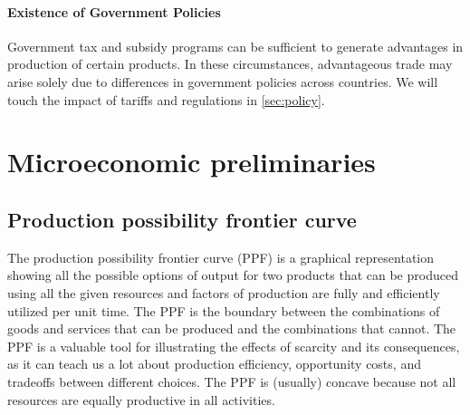{	\paragraph{Existence of Government Policies}
	Government tax and subsidy programs can be sufficient to generate advantages in production of certain products. In these circumstances, advantageous trade may arise solely due to differences in government policies across countries. We will touch the impact of tariffs and regulations in \autoref{sec:policy}.
	
	\pbn
	\section{Microeconomic preliminaries}\label{sec:Microeconomic_foundation}
	
	\subsection{Production possibility frontier curve}
	
	\begin{minipage}{0.6\linewidth}	
		The production possibility frontier curve (PPF) is a graphical representation showing all the possible options of output for two products that can be produced using all the given resources and factors of production are fully and efficiently utilized per unit time. The PPF is the boundary between the combinations of goods and services that can be produced and the combinations that cannot.
		The PPF is a valuable tool for illustrating the effects of scarcity and its consequences, as it can teach us a lot about production efficiency, opportunity costs, and tradeoffs between different choices. The PPF is (usually) concave because not all resources are equally productive in all activities.
	\end{minipage}
	\begin{minipage}{0.4\linewidth}	
		\begin{figure}[H]
			\begin{center}
\end{center}
\end{figure}
\end{minipage}}

